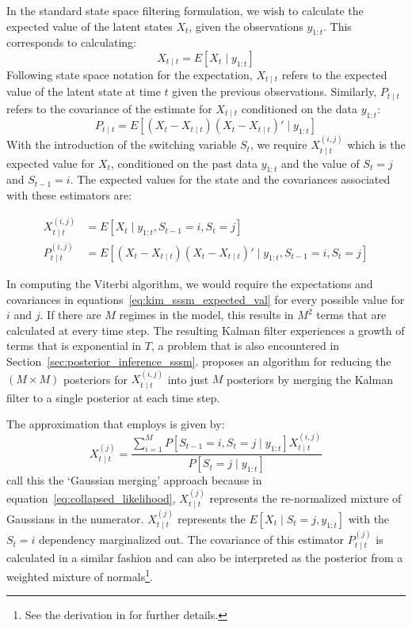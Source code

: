 In the standard state space filtering formulation, we wish to calculate the expected value of the latent states $X_t$, given the observations $y_{1:t}$. This corresponds to calculating:
\begin{equation}\label{eq:kim_ssm_expected_val}
  X_{t \mid t} = E[X_t \mid y_{1:t}]
\end{equation}
Following state space notation for the expectation, $X_{t \mid t}$ refers to the expected value of the latent state at time $t$ given the previous observations. Similarly, $P_{t \mid t}$ refers to the covariance of the estimate for $X_{t \mid t}$ conditioned on the data $y_{1:t}$:
\begin{equation}\label{eq:kim_ssm_covariance}
  P_{t \mid t} = E[(X_t - X_{t \mid t})(X_t - X_{t \mid t})' \mid y_{1:t}]
\end{equation}
With the introduction of the switching variable $S_t$, we require $X_{t \mid t}^{(i,j)}$ which is the expected value for $X_t$, conditioned on the past data $y_{1:t}$ and the value of $S_t = j$ and $S_{t-1} = i$. The expected values for the state and the covariances associated with these estimators are:

\begin{equation}\label{eq:kim_sssm_expected_val}
	\begin{split}
  X_{t \mid t}^{(i,j)} &= E[X_t \mid y_{1:t}, S_{t-1} = i, S_t = j] \\
  P_{t \mid t}^{(i,j)} &= E[(X_t - X_{t \mid t})(X_t - X_{t \mid t})' \mid y_{1:t}, S_{t-1} = i, S_t = j]
  	\end{split}
\end{equation}

In computing the Viterbi algorithm, we would require the expectations and covariances in equations~\ref{eq:kim_sssm_expected_val} for every possible value for $i$ and $j$. If there are $M$ regimes in the model, this results in $M^2$ terms that are calculated at every time step. The resulting Kalman filter experiences a growth of terms that is exponential in $T$, a problem that is also encountered in Section~\ref{sec:posterior_inference_sssm}. \cite{kim1994dynamic} proposes an algorithm for reducing the $(M \times M)$ posteriors for $X_{t \mid t}^{(i,j)}$ into just $M$ posteriors by merging the Kalman filter to a single posterior at each time step.

The approximation that \cite{kim1994dynamic} employs is given by:
\begin{equation}\label{eq:collapsed_likelihood}
  X_{t \mid t}^{(j)} = \frac{\sum\limits_{i=1}^{M} P[S_{t-1}=i, S_t=j \mid y_{1:t}]X_{t \mid t}^{(i,j)}}{P[S_t = j \mid y_{1:t}]}
\end{equation}
\cite{ghahramani2000variational} call this the `Gaussian merging' approach because in equation~\ref{eq:collapsed_likelihood}, $X_{t \mid t}^{(j)}$ represents the re-normalized mixture of Gaussians in the numerator. $X_{t \mid t}^{(j)}$ represents the $E[X_t \mid S_t = j, y_{1:t}]$ with the $S_t = i$ dependency marginalized out. The covariance of this estimator $P_{t \mid t}^{(j)}$ is calculated in a similar fashion and can also be interpreted as the posterior from a weighted mixture of normals\footnote{See the derivation in \cite{kim1994dynamic} for further details.}.

